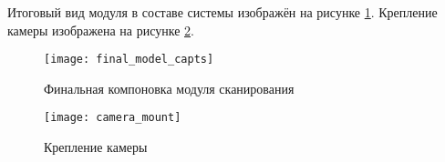         Итоговый вид модуля в составе системы изображён на рисунке \ref{pic:final_model}. Крепление камеры изображена на рисунке \ref{pic:camera_mount}.
        
        \begin{figure}[H]
            \centering
            \texttt{[image: final\_model\_capts]}
            \caption{Финальная компоновка модуля сканирования}
            \label{pic:final_model}
        \end{figure}
    
        \begin{figure}[H]
            \centering
            \texttt{[image: camera\_mount]}
            \caption{Крепление камеры}
            \label{pic:camera_mount}
        \end{figure}